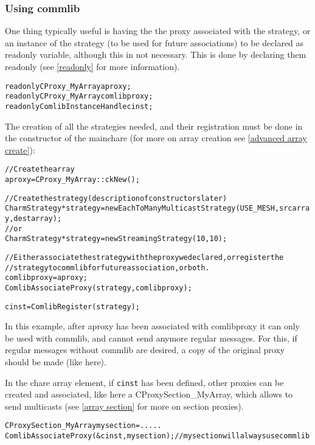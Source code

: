 \subsubsection{Using commlib}

One thing typically useful is having the the proxy associated with the strategy,
or an instance of the strategy (to be used for future associations) to be
declared as readonly variable, although this in not necessary. This is done by
declaring them readonly (see \ref{readonly} for more information).

\begin{alltt}
  readonly CProxy\_MyArray aproxy;
  readonly CProxy\_MyArray comlibproxy;
  readonly ComlibInstanceHandle cinst;
\end{alltt}

The creation of all the strategies needed, and their registration must be done
in the constructor of the mainchare (for more on array creation see
\ref{advanced array create}):

\begin{alltt}
  // Create the array
  aproxy = CProxy\_MyArray::ckNew();

  // Create the strategy (description of constructors later)
  CharmStrategy *strategy = new EachToManyMulticastStrategy(USE_MESH, srcarray, destarray);
  //or
  CharmStrategy *strategy = new StreamingStrategy(10,10);

  // Either associate the strategy with the proxy we declared, or register the
  // strategy to commlib for future association, or both.
  comlibproxy = aproxy;
  ComlibAssociateProxy(strategy, comlibproxy);

  cinst = ComlibRegister(strategy);
\end{alltt}

In this example, after aproxy has been associated with comlibproxy it can only be
used with commlib, and cannot send anymore regular messages. For this, if
regular messages without commlib are desired, a copy of the original proxy
should be made (like here).

In the chare array element, if {\texttt{cinst}} has been defined, other proxies
can be created and associated, like here a CProxySection\_MyArray, which allows
to send multicasts (see \ref{array section} for more on section proxies).

\begin{alltt}
  CProxySection\_MyArray mysection = .....
  ComlibAssociateProxy(\&cinst, mysection);  // mysection will always use commlib
\end{alltt}


